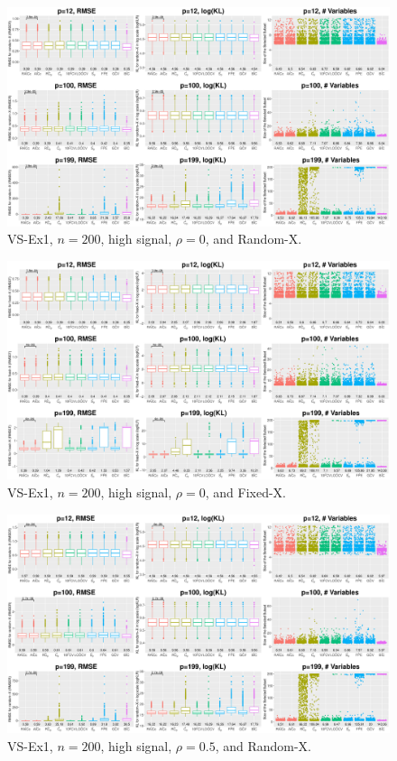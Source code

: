 \clearpage
\begin{figure}[!ht]
\centering
\includegraphics[width=\textwidth]{figures/supplement/randomx_VS-Ex1_n200_hsnr_rho0.eps}
\caption{VS-Ex1, $n=200$, high signal, $\rho=0$, and Random-X.}
\end{figure}
\begin{figure}[!ht]
\centering
\includegraphics[width=\textwidth]{figures/supplement/fixedx_VS-Ex1_n200_hsnr_rho0.eps}
\caption{VS-Ex1, $n=200$, high signal, $\rho=0$, and Fixed-X.}
\end{figure}
\clearpage
\begin{figure}[!ht]
\centering
\includegraphics[width=\textwidth]{figures/supplement/randomx_VS-Ex1_n200_hsnr_rho05.eps}
\caption{VS-Ex1, $n=200$, high signal, $\rho=0.5$, and Random-X.}
\end{figure}
